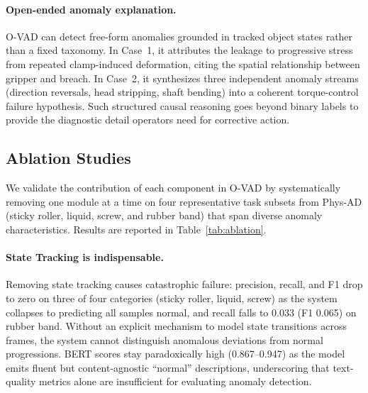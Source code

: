 \documentclass[runningheads]{llncs}
\begin{document}
\paragraph{\textbf{Open-ended anomaly explanation.}}
O-VAD can detect free-form anomalies grounded in tracked object states rather than a fixed taxonomy. In Case~1, it attributes the leakage to progressive stress from repeated clamp-induced deformation, citing the spatial relationship between gripper and breach. In Case~2, it synthesizes three independent anomaly streams (direction reversals, head stripping, shaft bending) into a coherent torque-control failure hypothesis. Such structured causal reasoning goes beyond binary labels to provide the diagnostic detail operators need for corrective action.





\subsection{Ablation Studies}

We validate the contribution of each component in O-VAD by systematically removing one module at a time on four representative task subsets from Phys-AD (sticky roller, liquid, screw, and rubber band) that span diverse anomaly characteristics. Results are reported in Table~\ref{tab:ablation}.

\paragraph{\textbf{State Tracking is indispensable.}} Removing state tracking causes catastrophic failure: precision, recall, and F1 drop to zero on three of four categories (sticky roller, liquid, screw) as the system collapses to predicting all samples normal, and recall falls to 0.033 (F1 0.065) on rubber band. Without an explicit mechanism to model state transitions across frames, the system cannot distinguish anomalous deviations from normal progressions. BERT scores stay paradoxically high (0.867–0.947) as the model emits fluent but content-agnostic ``normal'' descriptions, underscoring that text-quality metrics alone are insufficient for evaluating anomaly detection.
\end{document}
